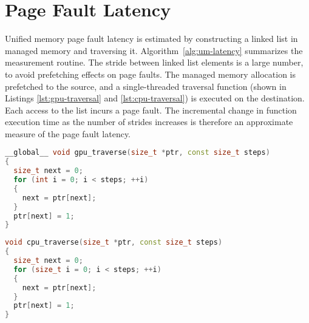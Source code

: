 %
%
%

\section{Page Fault Latency}
\label{sec:um-page-fault}

Unified memory page fault latency is estimated by constructing a linked list in managed memory and traversing it.
Algorithm~\ref{alg:um-latency} summarizes the measurement routine.
The stride between linked list elements is a large number, to avoid prefetching effects on page faults.
The managed memory allocation is prefetched to the source, and a single-threaded traversal function (shown in Listings \ref{lst:gpu-traversal} and \ref{lst:cpu-traversal}) is executed on the destination.
Each access to the list incurs a page fault.
The incremental change in function execution time as the number of strides increases is therefore an approximate measure of the page fault latency.


\begin{lstlisting}[language=c++, caption=GPU Linked List Traversal Kernel for Algorithm~\ref{alg:um-latency}, label=lst:gpu-traversal]
__global__ void gpu_traverse(size_t *ptr, const size_t steps)
{
  size_t next = 0;
  for (int i = 0; i < steps; ++i)
  {
    next = ptr[next];
  }
  ptr[next] = 1;
}
\end{lstlisting}

\begin{lstlisting}[language=c++, caption=CPU Linked List Traversal Function for Algorithm~\ref{alg:um-latency}, label=lst:cpu-traversal]
void cpu_traverse(size_t *ptr, const size_t steps)
{
  size_t next = 0;
  for (size_t i = 0; i < steps; ++i)
  {
    next = ptr[next];
  }
  ptr[next] = 1;
}
\end{lstlisting}

